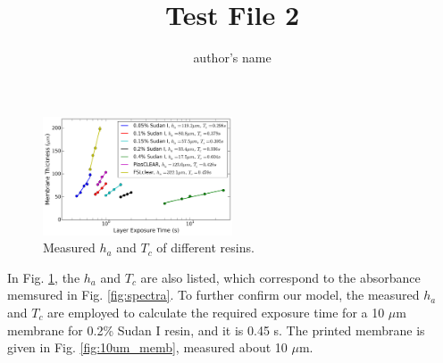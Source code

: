 \documentclass[12pt]{article}
\title{Test File 2}
\author{author's name}
\date{}
\begin{document}
\maketitle

\begin{figure}[!h]
\centering
  \includegraphics[width=0.5\textwidth]{ha_Tc.png}
  \caption{Measured $h_a$ and $T_c$ of different resins. }
  \label{fig:ha_Tc}
\end{figure}

In Fig. \ref{fig:ha_Tc}, the $h_a$ and $T_c$ are also listed, which correspond to the absorbance memsured in Fig. \ref{fig:spectra}. To further confirm our model, the measured $h_a$ and $T_c$ are employed to calculate the required exposure time for a 10 $\mu$m membrane for 0.2\% Sudan I resin, and it is 0.45 s. The printed membrane is given in Fig. \ref{fig:10um_memb}, measured about 10 $\mu$m.
\end{document}
